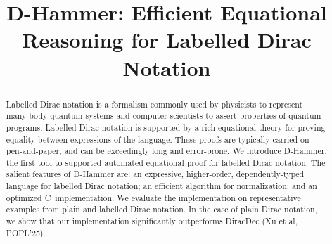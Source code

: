 \documentclass[runningheads]{llncs}
\newcommand{\CC}{C\nolinebreak\hspace{-.05em}\raisebox{.4ex}{\tiny\bf +}\nolinebreak\hspace{-.10em}\raisebox{.4ex}{\tiny\bf +}}
\def\CC{{C\nolinebreak[4]\hspace{-.05em}\raisebox{.4ex}{\tiny\bf ++}}}
\begin{document}
%
\title{D-Hammer: Efficient Equational Reasoning for Labelled Dirac Notation}
\author{}
\institute{}



%
\maketitle              %
%
\begin{abstract}
Labelled Dirac notation is a formalism commonly used by physicists to
represent many-body quantum systems and computer scientists to assert
properties of quantum programs. Labelled Dirac notation is supported
by a rich equational theory for proving equality between expressions
of the language. These proofs are typically carried on pen-and-paper,
and can be exceedingly long and error-prone. We introduce D-Hammer,
the first tool to supported automated equational proof for labelled
Dirac notation. The salient features of D-Hammer are: an expressive,
higher-order, dependently-typed language for labelled Dirac notation;
an efficient algorithm for normalization; and an optimized
\CC\ implementation. We evaluate the implementation on representative
examples from plain and labelled Dirac notation. In the case of plain
Dirac notation, we show that our implementation significantly
outperforms DiracDec (Xu et al, POPL'25).
  


\end{abstract}
%
%
%
\end{document}
